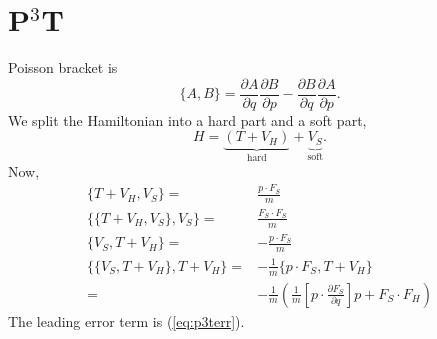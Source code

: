 \documentclass[11pt]{jsarticle}
\begin{document}
\section{P$^3$T} 
Poisson bracket is
\[
	\{A, B\} = 
	\frac{\partial A}{\partial q}\frac{\partial B}{\partial p}  -
	\frac{\partial B}{\partial q}\frac{\partial A}{\partial p}.
\]
We split the Hamiltonian into a hard part and a soft part,
\[
	H = \underbrace{(T + V_H)}_\text{hard} + \underbrace{V_S}_\text{soft}.
\]
Now,
\begin{align}
\{T+V_H, V_S\} =& \frac{p \cdot F_S}{m} \\
\{\{T+V_H, V_S\}, V_S\} =& \frac{F_S \cdot F_S}{m} \label{eq:p3terr} \\
\{V_S, T+V_H\} =& -\frac{p \cdot F_S}{m} \\
\{\{V_S, T+V_H\}, T+V_H\} 
 =& -\frac{1}{m} \{p \cdot F_S, T+V_H \} \nonumber \\
 =& -\frac{1}{m} \left( \frac1m \left[p \cdot \frac{\partial F_S}{\partial q}\right]p  + F_S \cdot F_H \right)
\end{align}
The leading error term is (\ref{eq:p3terr}).
\end{document}
